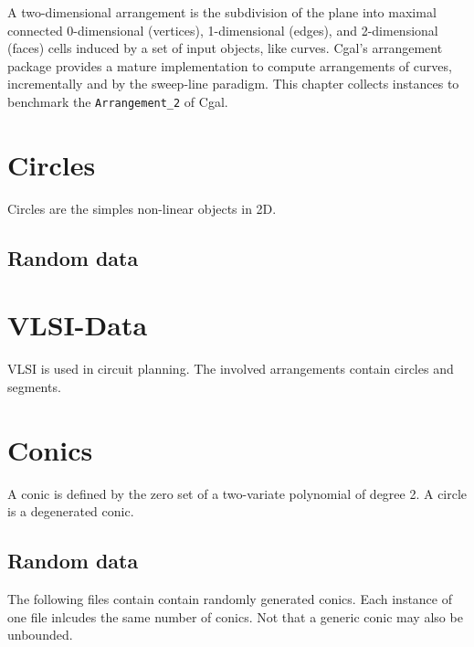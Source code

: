 
A two-dimensional arrangement is the subdivision of the plane into
maximal connected 0-dimensional (vertices), 1-dimensional (edges), 
and 2-dimensional (faces) cells induced by a set of input objects, like
curves. {\sc Cgal}'s arrangement package provides a mature implementation
to compute arrangements of curves, incrementally and by the sweep-line
paradigm. This chapter collects instances to benchmark the 
{\tt Arrangement\_2} of {\sc Cgal}.

\section{Circles\label{bi_sec:Arrangement2Circles}}

Circles are the simples non-linear objects in 2D. 

\subsection{Random data\label{bi_sec:Arrangement2CirclesRandomdata}}


\section{VLSI-Data\label{bi_sec:Arrangement2VLSI}}

VLSI is used in circuit planning. The involved arrangements contain
circles and segments.

\section{Conics\label{bi_sec:Arrangement2Conics}}

A conic is defined by the zero set of a two-variate polynomial
of degree 2. A circle is a degenerated conic.

\subsection{Random data\label{bi_sec:Arrangement2ConicsRandomdata}}

The following files contain contain randomly generated conics. 
Each instance of one file inlcudes the same number of conics. Not that
a generic conic may also be unbounded.


